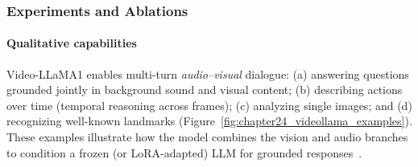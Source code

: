 \begin{enrichment}
\begin{enrichment}
        \begin{table}[H]
            \centering
            \small
            \setlength{\tabcolsep}{8pt}
            \caption{Comparison with popular multimodal LLMs: Video-LLaMA uniquely handles \emph{images}, \emph{silent videos}, and \emph{audio} jointly (Adapted from Table~1 of \cite{zhang2023_videollama}).}
            \label{tab:videollama_model_capabilities}
        \end{table} 
        
        \subsubsection{Experiments and Ablations}
        \label{subsubsec:chapter24_videollama1_expts}
        
        \paragraph{Qualitative capabilities}
        Video-LLaMA1 enables multi-turn \emph{audio–visual} dialogue: (a) answering questions grounded jointly in background sound and visual content; (b) describing actions over time (temporal reasoning across frames); (c) analyzing single images; and (d) recognizing well-known landmarks (Figure~\ref{fig:chapter24_videollama_examples}). These examples illustrate how the model combines the vision and audio branches to condition a frozen (or LoRA-adapted) LLM for grounded responses~\cite{zhang2023_videollama}.
        

\end{enrichment}
\end{enrichment}
